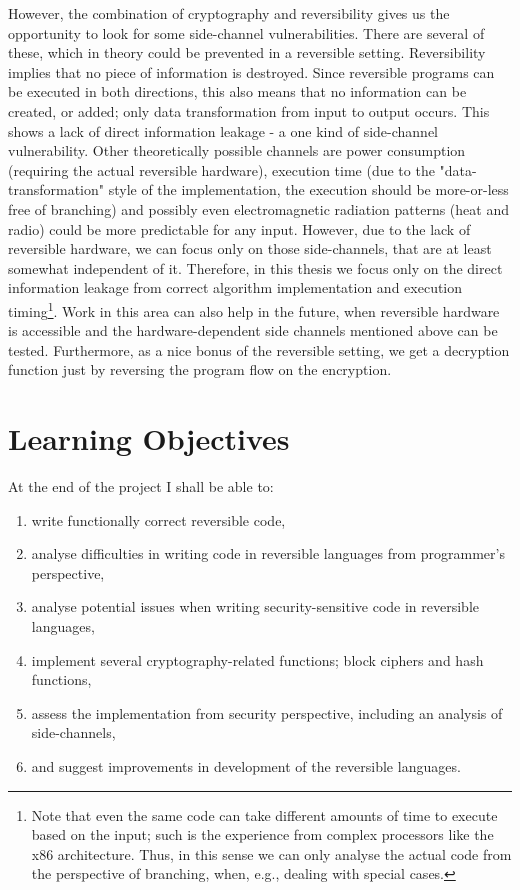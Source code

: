 \documentclass[a4paper]{article}
\begin{document}
However, the combination of cryptography and reversibility gives us the 
opportunity to look for some side-channel vulnerabilities. There are 
several of these, which in theory could be prevented in a reversible 
setting. Reversibility implies that no piece of information is 
destroyed. Since reversible programs can be executed in both 
directions, this also means that no information can be created, or 
added; only data transformation from input to output occurs. This shows 
a lack of direct information leakage - a one kind of side-channel 
vulnerability. Other theoretically possible channels are power 
consumption (requiring the actual reversible hardware), execution time 
(due to the "data-transformation" style of the implementation, the 
execution should be more-or-less free of branching) and possibly even 
electromagnetic radiation patterns (heat and radio) could be more 
predictable for any input. However, due to the lack of reversible 
hardware, we can focus only on those side-channels, that are at least 
somewhat independent of it. Therefore, in this thesis we focus only on 
the direct information leakage from correct algorithm implementation 
and execution timing\footnote{Note that even the same code can take 
different amounts of time to execute based on the input; such is the 
experience from complex processors like the x86 architecture. Thus, in 
this sense we can only analyse the actual code from the perspective of 
branching, when, e.g., dealing with special cases.}. Work in this area 
can also help in the future, when reversible hardware is accessible and 
the hardware-dependent side channels mentioned above can be tested. 
Furthermore, as a nice bonus of the reversible setting, we get a 
decryption function just by reversing the program flow on the 
encryption.

\newpage

\section*{Learning Objectives}

At the end of the project I shall be able to:
\begin{enumerate}
\item write functionally correct reversible code,
\item analyse difficulties in writing code in reversible languages from programmer's perspective,
\item analyse potential issues when writing security-sensitive code in reversible languages,
\item implement several cryptography-related functions; block ciphers and hash functions,
\item assess the implementation from security perspective, including an analysis of side-channels,
\item and suggest improvements in development of the reversible languages.
\end{enumerate}

\nocite{*} %


\end{document}
